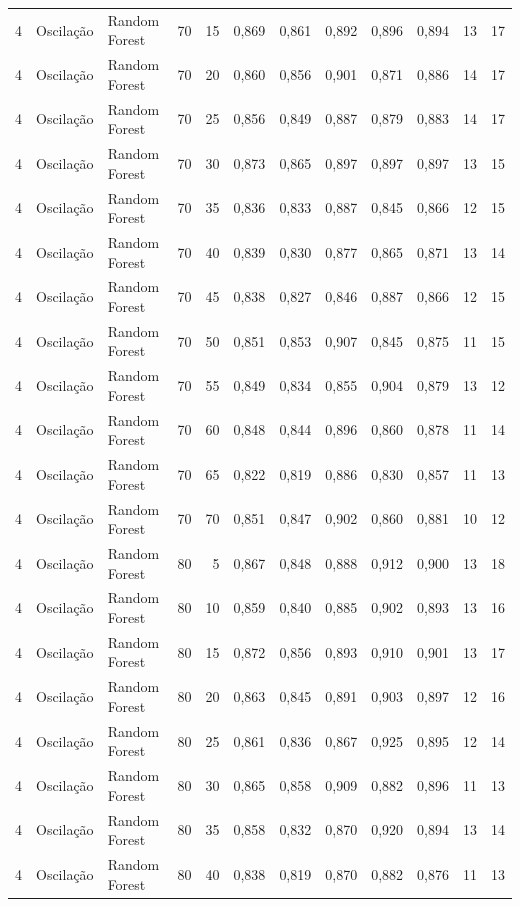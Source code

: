 \begin{longtable}{@{}rllrrrrrrrrr@{}}
4 & Oscilação & Random Forest & 70 & 15 & 0,869 & 0,861 & 0,892 & 0,896 & 0,894 & 13 & 17 \\
4 & Oscilação & Random Forest & 70 & 20 & 0,860 & 0,856 & 0,901 & 0,871 & 0,886 & 14 & 17 \\
4 & Oscilação & Random Forest & 70 & 25 & 0,856 & 0,849 & 0,887 & 0,879 & 0,883 & 14 & 17 \\
4 & Oscilação & Random Forest & 70 & 30 & 0,873 & 0,865 & 0,897 & 0,897 & 0,897 & 13 & 15 \\
4 & Oscilação & Random Forest & 70 & 35 & 0,836 & 0,833 & 0,887 & 0,845 & 0,866 & 12 & 15 \\
4 & Oscilação & Random Forest & 70 & 40 & 0,839 & 0,830 & 0,877 & 0,865 & 0,871 & 13 & 14 \\
4 & Oscilação & Random Forest & 70 & 45 & 0,838 & 0,827 & 0,846 & 0,887 & 0,866 & 12 & 15 \\
4 & Oscilação & Random Forest & 70 & 50 & 0,851 & 0,853 & 0,907 & 0,845 & 0,875 & 11 & 15 \\
4 & Oscilação & Random Forest & 70 & 55 & 0,849 & 0,834 & 0,855 & 0,904 & 0,879 & 13 & 12 \\
4 & Oscilação & Random Forest & 70 & 60 & 0,848 & 0,844 & 0,896 & 0,860 & 0,878 & 11 & 14 \\
4 & Oscilação & Random Forest & 70 & 65 & 0,822 & 0,819 & 0,886 & 0,830 & 0,857 & 11 & 13 \\
4 & Oscilação & Random Forest & 70 & 70 & 0,851 & 0,847 & 0,902 & 0,860 & 0,881 & 10 & 12 \\
4 & Oscilação & Random Forest & 80 & 5 & 0,867 & 0,848 & 0,888 & 0,912 & 0,900 & 13 & 18 \\
4 & Oscilação & Random Forest & 80 & 10 & 0,859 & 0,840 & 0,885 & 0,902 & 0,893 & 13 & 16 \\
4 & Oscilação & Random Forest & 80 & 15 & 0,872 & 0,856 & 0,893 & 0,910 & 0,901 & 13 & 17 \\
4 & Oscilação & Random Forest & 80 & 20 & 0,863 & 0,845 & 0,891 & 0,903 & 0,897 & 12 & 16 \\
4 & Oscilação & Random Forest & 80 & 25 & 0,861 & 0,836 & 0,867 & 0,925 & 0,895 & 12 & 14 \\
4 & Oscilação & Random Forest & 80 & 30 & 0,865 & 0,858 & 0,909 & 0,882 & 0,896 & 11 & 13 \\
4 & Oscilação & Random Forest & 80 & 35 & 0,858 & 0,832 & 0,870 & 0,920 & 0,894 & 13 & 14 \\
4 & Oscilação & Random Forest & 80 & 40 & 0,838 & 0,819 & 0,870 & 0,882 & 0,876 & 11 & 13 \\

\end{longtable}
